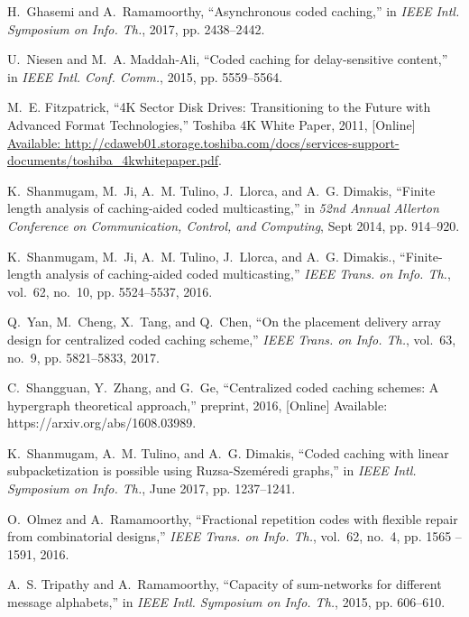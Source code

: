\documentclass[journal,twocolumn]{IEEEtran}
\theoremstyle{definition}
\begin{document}
\begin{thebibliography}{10}
H.~Ghasemi and A.~Ramamoorthy, ``Asynchronous coded caching,'' in \emph{IEEE
  Intl. Symposium on Info. Th.}, 2017, pp. 2438--2442.

U.~Niesen and M.~A. Maddah-Ali, ``Coded caching for delay-sensitive content,''
  in \emph{IEEE Intl. Conf. Comm.}, 2015, pp. 5559--5564.

M.~E. Fitzpatrick, ``{4K Sector Disk Drives: Transitioning to the Future with
  Advanced Format Technologies},'' {Toshiba 4K White Paper}, 2011, [Online]
  \url{Available:
  http://cdaweb01.storage.toshiba.com/docs/services-support-documents/toshiba_4kwhitepaper.pdf}.

K.~Shanmugam, M.~Ji, A.~M. Tulino, J.~Llorca, and A.~G. Dimakis, ``Finite
  length analysis of caching-aided coded multicasting,'' in \emph{52nd Annual
  Allerton Conference on Communication, Control, and Computing}, Sept 2014, pp.
  914--920.

K.~Shanmugam, M.~Ji, A.~M. Tulino, J.~Llorca, and A.~G. Dimakis.,
  ``Finite-length analysis of caching-aided coded multicasting,'' \emph{IEEE
  Trans. on Info. Th.}, vol.~62, no.~10, pp. 5524--5537, 2016.

Q.~Yan, M.~Cheng, X.~Tang, and Q.~Chen, ``On the placement delivery array
  design for centralized coded caching scheme,'' \emph{IEEE Trans. on Info.
  Th.}, vol.~63, no.~9, pp. 5821--5833, 2017.

C.~Shangguan, Y.~Zhang, and G.~Ge, ``Centralized coded caching schemes: A
  hypergraph theoretical approach,'' preprint, 2016, [Online] Available:
  https://arxiv.org/abs/1608.03989.

K.~Shanmugam, A.~M. Tulino, and A.~G. Dimakis, ``{Coded caching with linear
  subpacketization is possible using Ruzsa-Szem{\'{e}}redi graphs},'' in
  \emph{IEEE Intl. Symposium on Info. Th.}, June 2017, pp. 1237--1241.

O.~Olmez and A.~Ramamoorthy, ``{Fractional repetition codes with flexible
  repair from combinatorial designs},'' \emph{IEEE Trans. on Info. Th.},
  vol.~62, no.~4, pp. 1565 --1591, 2016.

A.~S. Tripathy and A.~Ramamoorthy, ``Capacity of sum-networks for different
  message alphabets,'' in \emph{IEEE Intl. Symposium on Info. Th.}, 2015, pp.
  606--610.


\end{thebibliography}
\end{document}
